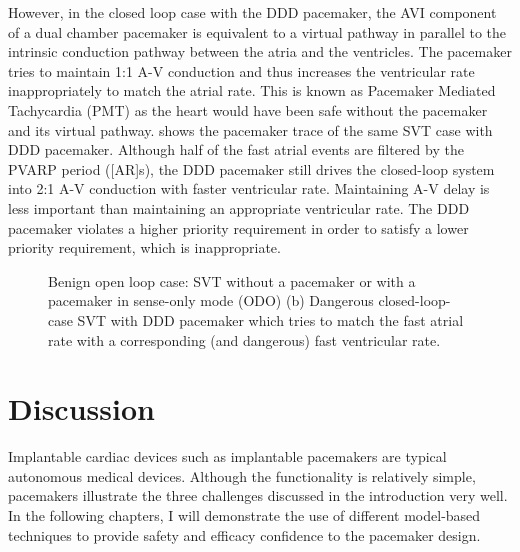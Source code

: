 However, in the closed loop case with the DDD pacemaker, the AVI component of a dual chamber pacemaker is equivalent to a virtual pathway in parallel to the intrinsic conduction pathway between the atria and the ventricles. The pacemaker tries to maintain 1:1 A-V conduction and thus increases the ventricular rate inappropriately to match the atrial rate.  This is known as Pacemaker Mediated Tachycardia (PMT) as the heart would have been safe without the pacemaker and its virtual pathway.  shows the pacemaker trace of the same SVT case with DDD pacemaker. Although half of the fast atrial events are filtered by the PVARP period ([AR]s), the DDD pacemaker still drives the closed-loop system into 2:1 A-V conduction with faster ventricular rate. Maintaining A-V delay is less important than maintaining an appropriate ventricular rate. The DDD pacemaker violates a higher priority requirement in order to satisfy a lower priority requirement, which is inappropriate.
\begin{figure}[!t]
\centering
		
\caption{\small Benign open loop case: SVT without a pacemaker or with a pacemaker in sense-only mode (ODO) (b) Dangerous closed-loop-case SVT with DDD pacemaker which tries to match the fast atrial rate with a corresponding (and dangerous) fast ventricular rate.}
\end{figure} 

\section{Discussion}
Implantable cardiac devices such as implantable pacemakers are typical autonomous medical devices.
Although the functionality is relatively simple, pacemakers illustrate the three challenges discussed in the introduction very well.
In the following chapters, I will demonstrate the use of different model-based techniques to provide safety and efficacy confidence to the pacemaker design.


